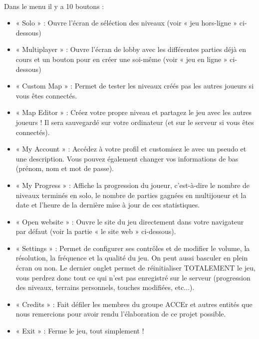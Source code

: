 \documentclass[titlepage, 13px, a4paper]{report}
\begin{document}
\paragraph*{} \hspace{0pt}
Dans le menu il y a 10 boutons : \\
{\begin{itemize}
	\item « Solo » : Ouvre l'écran de séléction des niveaux (voir « jeu hors-ligne » ci-dessous)
	\item « Multiplayer » : Ouvre l'écran de lobby avec les différentes parties déjà en cours et 
		un bouton pour en créer une soi-même (voir « jeu en ligne » ci-dessous)
	\item « Custom Map » : Permet de tester les niveaux créés pas les autres joueurs si vous êtes connectés.
	\item « Map Editor » : Créez votre propre niveau et partagez le jeu avec les autres joueurs ! 
		Il sera sauvegardé sur votre ordinateur (et sur le serveur si vous êtes connectés).
	\item « My Account » :  Accédez à votre profil et customisez le avec un pseudo et une description. 
		Vous pouvez également changer vos informations de bas (prénom, nom et mot de passe).
	\item « My Progress » : Affiche la progression du joueur, c'est-à-dire le nombre de niveaux terminés 
		en solo, le nombre de parties gagnées en multijoueur et la date et l'heure de la dernière mise à jour 
		de ces statistiques.
	\item « Open website » : Ouvre le site du jeu directement dans votre navigateur par défaut (voir la partie 
		« le site web » ci-dessous).
	\item « Settings » : Permet de configurer ses contrôles et de modifier le volume, la résolution, la fréquence 
		et la qualité du jeu. On peut aussi basculer en plein écran ou non. Le dernier onglet permet de réinitialiser 
		TOTALEMENT le jeu, vous perdrez donc tout ce qui n'est pas enregistré sur le serveur (progression des niveaux, 
		terrains personnels, touches modifiées, etc...).
	\item « Credits » : Fait défiler les membres du groupe ACCEr et autres entités que nous remercions pour avoir 
		rendu l'élaboration de ce projet possible.
	\item « Exit » :  Ferme le jeu, tout simplement !  \\
\end{itemize}}
\end{document}
